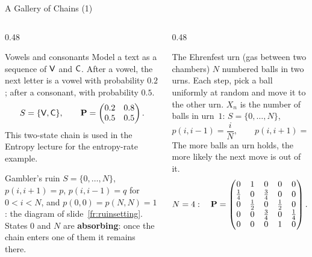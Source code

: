 \begin{frame}{A Gallery of Chains (1)}
  \label{fr:gallery1}
  \small
  \begin{columns}[T]
    \begin{column}{0.48\textwidth}
      \begin{block}{Vowels and consonants}
        Model a text as a sequence of $\mathsf{V}$ and $\mathsf{C}$. After a vowel, the next letter is a vowel with probability $0.2$; after a consonant, with probability $0.5$.
        \[
          S=\{\mathsf{V},\mathsf{C}\},\qquad \mathbf{P}=\begin{pmatrix}0.2&0.8\\0.5&0.5\end{pmatrix}.
        \]
        This two-state chain is used in the Entropy lecture for the entropy-rate example.
      \end{block}
      \begin{block}{Gambler's ruin}
        $S=\{0,\dots,N\}$, $p(i,i+1)=p$, $p(i,i-1)=q$ for $0<i<N$, and $p(0,0)=p(N,N)=1$: the diagram of slide~\ref{fr:ruinsetting}. States $0$ and $N$ are \textbf{absorbing}: once the chain enters one of them it remains there.
      \end{block}
    \end{column}
    \begin{column}{0.48\textwidth}
      \begin{block}{The Ehrenfest urn (gas between two chambers)}
        $N$ numbered balls in two urns. Each step, pick a ball uniformly at random and move it to the other urn. $X_n$ is the number of balls in urn~$1$: $S=\{0,\dots,N\}$,
        \[
          p(i,i-1)=\frac iN,\qquad p(i,i+1)=\frac{N-i}{N}.
        \]
        The more balls an urn holds, the more likely the next move is out of it.
        \[
          N=4:\quad \mathbf{P}=\begin{pmatrix}0&1&0&0&0\\ \tfrac14&0&\tfrac34&0&0\\ 0&\tfrac12&0&\tfrac12&0\\ 0&0&\tfrac34&0&\tfrac14\\ 0&0&0&1&0\end{pmatrix}.
        \]
      \end{block}
    \end{column}
  \end{columns}
\end{frame}


